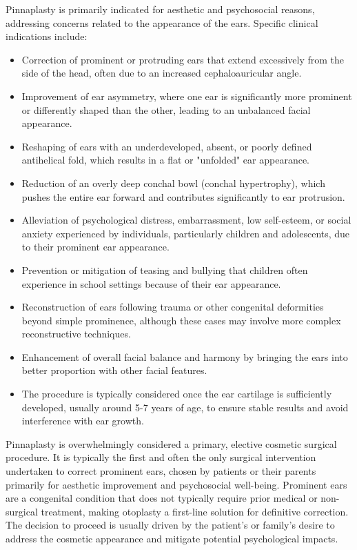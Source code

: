 Pinnaplasty is primarily indicated for aesthetic and psychosocial reasons, addressing concerns related to the appearance of the ears. Specific clinical indications include:

\begin{itemize}
  \item Correction of prominent or protruding ears that extend excessively from the side of the head, often due to an increased cephaloauricular angle.
  \item Improvement of ear asymmetry, where one ear is significantly more prominent or differently shaped than the other, leading to an unbalanced facial appearance.
  \item Reshaping of ears with an underdeveloped, absent, or poorly defined antihelical fold, which results in a flat or "unfolded" ear appearance.
  \item Reduction of an overly deep conchal bowl (conchal hypertrophy), which pushes the entire ear forward and contributes significantly to ear protrusion.
  \item Alleviation of psychological distress, embarrassment, low self-esteem, or social anxiety experienced by individuals, particularly children and adolescents, due to their prominent ear appearance.
  \item Prevention or mitigation of teasing and bullying that children often experience in school settings because of their ear appearance.
  \item Reconstruction of ears following trauma or other congenital deformities beyond simple prominence, although these cases may involve more complex reconstructive techniques.
  \item Enhancement of overall facial balance and harmony by bringing the ears into better proportion with other facial features.
\item The procedure is typically considered once the ear cartilage is sufficiently developed, usually around 5-7 years of age, to ensure stable results and avoid interference with ear growth.
\end{itemize}

Pinnaplasty is overwhelmingly considered a primary, elective cosmetic surgical procedure. It is typically the first and often the only surgical intervention undertaken to correct prominent ears, chosen by patients or their parents primarily for aesthetic improvement and psychosocial well-being. Prominent ears are a congenital condition that does not typically require prior medical or non-surgical treatment, making otoplasty a first-line solution for definitive correction. The decision to proceed is usually driven by the patient's or family's desire to address the cosmetic appearance and mitigate potential psychological impacts.

